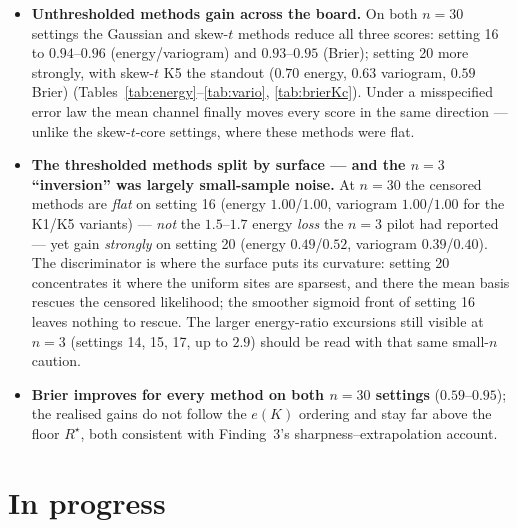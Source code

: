 \documentclass[11pt]{article}
\begin{document}
\begin{itemize}
\item \textbf{Unthresholded methods gain across the board.} On both $n = 30$
settings the Gaussian and skew-$t$ methods reduce all three scores: setting 16
to $0.94$--$0.96$ (energy/variogram) and $0.93$--$0.95$ (Brier); setting 20
more strongly, with skew-$t$ K5 the standout ($0.70$ energy, $0.63$ variogram,
$0.59$ Brier) (Tables~\ref{tab:energy}--\ref{tab:vario}, \ref{tab:brierKc}).
Under a misspecified error law the mean channel finally moves every score in
the same direction --- unlike the skew-$t$-core settings, where these methods
were flat.
\item \textbf{The thresholded methods split by surface --- and the $n = 3$
``inversion'' was largely small-sample noise.} At $n = 30$ the censored
methods are \emph{flat} on setting 16 (energy $1.00$/$1.00$, variogram
$1.00$/$1.00$ for the K1/K5 variants) --- \emph{not} the $1.5$--$1.7$ energy
\emph{loss} the $n = 3$ pilot had reported --- yet gain \emph{strongly} on
setting 20 (energy $0.49$/$0.52$, variogram $0.39$/$0.40$). The discriminator
is where the surface puts its curvature: setting 20 concentrates it where the
uniform sites are sparsest, and there the mean basis rescues the censored
likelihood; the smoother sigmoid front of setting 16 leaves nothing to rescue.
The larger energy-ratio excursions still visible at $n = 3$ (settings 14, 15,
17, up to $2.9$) should be read with that same small-$n$ caution.
\item \textbf{Brier improves for every method on both $n = 30$ settings}
($0.59$--$0.95$); the realised gains do not follow the $e(K)$ ordering and
stay far above the floor $R^\star$, both consistent with Finding~3's
sharpness--extrapolation account.
\end{itemize}

\section{In progress}
\end{document}

